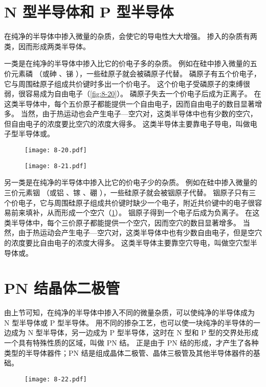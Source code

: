 \section{N 型半导体和 P 型半导体}
在纯净的半导体中掺入微量的杂质，会使它的导电性大大增强。
掺入的杂质有两类，因而形成两类半导体。

一类是在纯净的半导体中掺入比它的价电子多的杂质。
例如在硅中掺入微量的五价元素磷 （或砷 、锑 ），一些硅原子就会被磷原子代替。
磷原子有五个价电子，它与周围硅原子组成共价键时多出一个价电子。
这个价电子受磷原子的束缚很弱，很容易成为自由电子（\cref{fig:8-20}）。
磷原子失去一个价电子后成为正离子。
在这类半导体中，每个五价原子都能提供一个自由电子，因而自由电子的数目显著增多。
当然，由于热运动也会产生电子—空穴对，这类半导体中也有少数的空穴，但自由电子的浓度要比空穴的浓度大得多。
这类半导体主要靠电子导电，叫做电子型半导体或。
\begin{figure}
  \begin{minipage}[b]{0.48\linewidth}\centering
    \texttt{[image: 8-20.pdf]}
    \caption{}\label{fig:8-20}
  \end{minipage}
  \begin{minipage}[b]{0.48\linewidth}\centering
    \texttt{[image: 8-21.pdf]}
    \caption{}\label{fig:8-21}
  \end{minipage}
\end{figure}

另一类是在纯净的半导体中掺入比它的价电子少的杂质。
例如在硅中掺入微量的三价元素铟 （或铝 、镓 、硼 ），一些硅原子就会被铟原子代替。
铟原子只有三个价电子，它与周围硅原子组成共价键时缺少一个电子，附近共价键中的电子很容易前来填补，从而形成一个空穴（\cref{fig:8-21}）。
铟原子得到一个电子后成为负离子。
在这类半导体中，每个三价原子都能提供一个空穴，因而空穴的数目显著增多。
当然，由于热运动会产生电子—空穴对，这类半导体中也有少数自由电子，但是空穴的浓度要比自由电子的浓度大得多。
这类半导体主要靠空穴导电，叫做空穴型半导体或。

\section{PN 结\texorpdfstring{\quad}{ }晶体二极管}
由上节可知，在纯净的半导体中掺入不同的微量杂质，可以使纯净的半导体成为 N 型半导体或 P 型半导体。
用不同的掺杂工艺，也可以使一块纯净的半导体的一边成为 N 型半导体，另一边成为 P 型半导体，这时在 N 型和 P 型的交界处形成一个具有特殊性质的区域，叫做 PN 结。
正是由于 PN 结的形成，才产生了各种类型的半导体器件；PN 结是组成晶体二极管、晶体三极管及其他半导体器件的基础。
\begin{figure}
  \texttt{[image: 8-22.pdf]}
  \caption{}\label{fig:8-22}
\end{figure}

